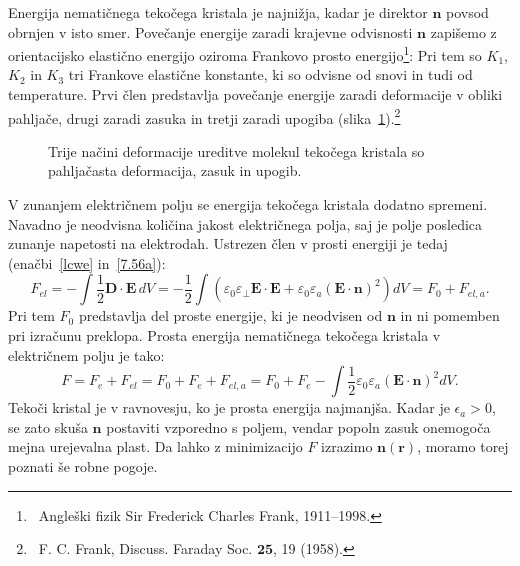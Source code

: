 Energija nematičnega tekočega kristala je najnižja, kadar je direktor $\mathbf{n}$
povsod obrnjen v isto smer. Povečanje energije zaradi krajevne odvisnosti $\mathbf{n}$
zapišemo z orientacijsko elastično energijo oziroma Frankovo prosto 
energijo\footnote{~Angleški fizik Sir Frederick Charles Frank, 
1911--1998.}:
Pri tem so $K_{1}$, $K_{2}$ in $K_{3}$ tri Frankove elastične
konstante, ki so odvisne od snovi in tudi od temperature. 
Prvi člen predstavlja povečanje energije zaradi deformacije v obliki 
pahljače, drugi zaradi zasuka in tretji zaradi upogiba (slika~\ref{s7.20}).\footnote{~F. C.
Frank, Discuss. Faraday Soc. $\mathbf{25}$, 19 (1958).}
\begin{figure}[ht]
\centering
\def\svgwidth{128truemm} 

\caption{Trije načini deformacije ureditve molekul tekočega kristala so pahljačasta deformacija,
zasuk in upogib.}
\label{s7.20}
\end{figure}

V zunanjem električnem polju se energija tekočega kristala dodatno spremeni. 
Navadno je neodvisna količina jakost električnega polja, saj je polje posledica
zunanje napetosti na elektrodah. Ustrezen člen v prosti energiji je tedaj 
(enačbi~\ref{lcwe} in~\ref{7.56a}):
\begin{equation}
F_{el} = -\int \frac{1}{2} \mathbf{D}\cdot\mathbf{E}\, dV= -\frac{1}{2} \int
\left( \varepsilon_0 \varepsilon_\bot \mathbf{E}\cdot\mathbf{E} + 
\varepsilon_{0}\varepsilon_{a}(\mathbf{E}\cdot\mathbf{n})^{2}\right)dV = F_0 + F_{el,a}.
\end{equation}
Pri tem $F_{0}$ predstavlja del proste energije, ki je neodvisen od $\mathbf{n}$ in 
ni pomemben pri izračunu preklopa. Prosta energija
nematičnega tekočega kristala v električnem polju je tako:
\begin{equation}
F=F_e + F_{el} = F_0 + F_e + F_{el,a} = F_{0}+F_{e}-\int \frac{1}{2}\varepsilon_{0}\varepsilon_{a}
(\mathbf{E}\cdot \mathbf{n})^{2}dV.
\label{7.72}
\end{equation}
Tekoči kristal je v ravnovesju, ko je prosta energija najmanjša. Kadar je
$\epsilon_{a}>0$, se zato skuša $\mathbf{n}$ postaviti vzporedno s
poljem, vendar popoln zasuk onemogoča mejna urejevalna plast. 
Da lahko z minimizacijo $F$ izrazimo $\mathbf{n}(\mathbf{r})$, moramo
torej poznati še robne pogoje.

